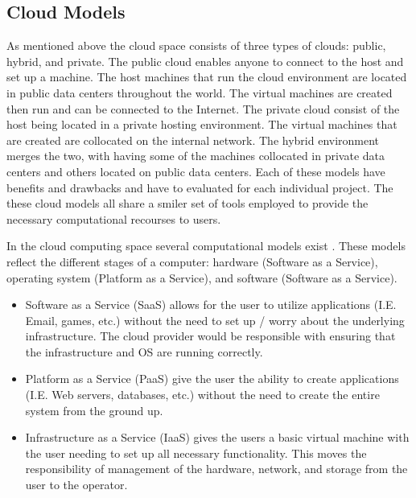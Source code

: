 \documentclass[12pt]{article}
\begin{document}
\subsection{Cloud Models}
As mentioned above the cloud space consists of three types of clouds: public, hybrid, and private. The public cloud enables anyone to connect to the host and set up a machine. The host machines that run the cloud environment are located in public data centers throughout the world. The virtual machines are created then run and can be connected to the Internet.  The private cloud consist of the host being located in a private hosting environment. The virtual machines that are created are collocated on the internal network. The hybrid environment merges the two, with having some of the machines collocated in private data centers and others located on public data centers. Each of these models have benefits and drawbacks and have to evaluated for each individual project. The these cloud models all share a smiler set of tools employed to provide the necessary computational recourses to users.

In the cloud computing space several computational models exist \cite{wikipedia}. These models reflect the different stages of a computer: hardware (Software as a Service), operating system (Platform as a Service), and software (Software as a Service).

\begin{itemize}
    \item Software as a Service (SaaS) allows for the user to utilize applications (I.E. Email, games, etc.) without the need to set up / worry about the underlying infrastructure. The cloud provider would be responsible with ensuring that the infrastructure and OS are running correctly.
    \item Platform as a Service (PaaS) give the user the ability to create applications (I.E. Web servers, databases, etc.) without the need to create the entire system from the ground up.
    \item Infrastructure as a Service (IaaS) gives the users a basic virtual machine with the user needing to set up all necessary functionality. This moves the responsibility of management of the hardware, network, and storage from the user to the operator.
\end{itemize}
\end{document}

